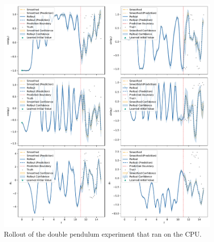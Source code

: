 	\begin{figure}
		\centering
		\includegraphics[width=\linewidth]{figures/results/cpu-vs-gpu/acrobot-gpu/rollout-observations-N0.pdf}
		\caption[Rollout of the double pendulum experiment that ran on the CPU]{Rollout of the double pendulum experiment that ran on the CPU.}
		\label{fig:cpuVsGpuCpu}
	\end{figure}
